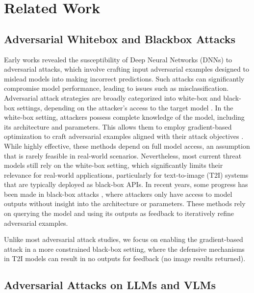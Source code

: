 \section{Related Work}
\subsection{Adversarial Whitebox and Blackbox Attacks}

Early works \cite{szegedy2013intriguing,goodfellow2014explaining} revealed the susceptibility of Deep Neural Networks (DNNs) to adversarial attacks, which involve crafting input adversarial examples designed to mislead models into making incorrect predictions. 
Such attacks can significantly compromise model performance, leading to issues such as misclassification. 
Adversarial attack strategies are broadly categorized into white-box and black-box settings, depending on the attacker's access to the target model \cite{costa2024deep}.
In the white-box setting, attackers possess complete knowledge of the model, including its architecture and parameters. This allows them to employ gradient-based optimization \cite{amari1993backpropagation} to craft adversarial examples aligned with their attack objectives \cite{carlini2017towards,goodfellow2014explaining,moosavi2016deepfool,wong2020fast,madry2017towards,dong2018boosting}. While highly effective, these methods depend on full model access, an assumption that is rarely feasible in real-world scenarios.
Nevertheless, most current threat models still rely on the white-box setting, which significantly limits their relevance for real-world applications, particularly for text-to-image (T2I) systems that are typically deployed as black-box APIs. 
In recent years, some progress has been made in black-box attacks \cite{andriushchenko2020square,wicker2018feature}, where attackers only have access to model outputs without insight into the architecture or parameters.
These methods rely on querying the model and using its outputs as feedback to iteratively refine adversarial examples.


Unlike most adversarial attack studies, we focus on enabling the gradient-based attack in a more constrained black-box setting, where the defensive mechanisms in T2I models can result in no outputs for feedback (no image results returned).






\subsection{Adversarial Attacks on LLMs and VLMs}


